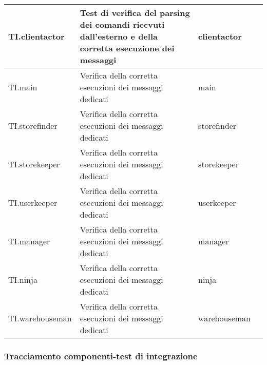 \documentclass{scalatekids-article}
\begin{document}
\begin{longtable}[H]{| l | p{10cm} | l | l |}
  \hline
  TI.clientactor & Test di verifica del parsing dei comandi riecvuti dall'esterno e della corretta esecuzione dei messaggi & clientactor &\\
  \hline
  TI.main & Verifica della corretta esecuzioni dei messaggi dedicati & main &\\
  \hline
  TI.storefinder & Verifica della corretta esecuzioni dei messaggi dedicati & storefinder &\\
  \hline
  TI.storekeeper & Verifica della corretta esecuzioni dei messaggi dedicati & storekeeper &\\
  \hline
  TI.userkeeper & Verifica della corretta esecuzioni dei messaggi dedicati & userkeeper &\\
  \hline
  TI.manager & Verifica della corretta esecuzioni dei messaggi dedicati & manager &\\
  \hline
  TI.ninja & Verifica della corretta esecuzioni dei messaggi dedicati & ninja &\\
  \hline
  TI.warehouseman & Verifica della corretta esecuzioni dei messaggi dedicati & warehouseman &\\
  \hline
\end{longtable}

\subsubsection{Tracciamento componenti-test di integrazione}
\end{document}
